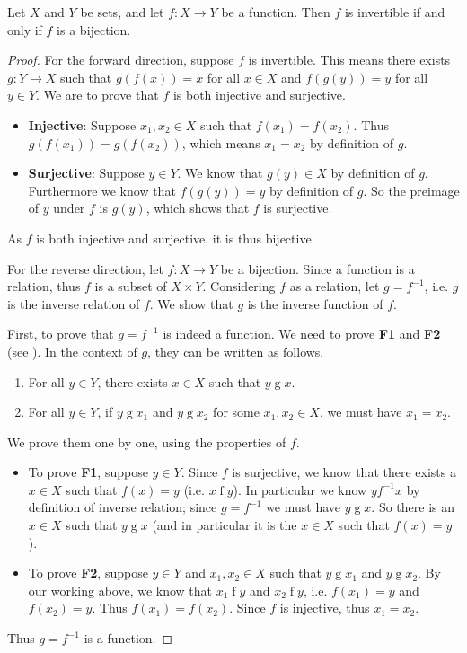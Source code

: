 \begin{theorem}\label{theorem:invertible-if-and-only-if-bijective}
    Let $X$ and $Y$ be sets, and let $f: X \to Y$ be a function. Then $f$ is invertible if and only if $f$ is a bijection.
\end{theorem}
\begin{proof}
    For the forward direction, suppose $f$ is invertible. This means there exists $g: Y \to X$ such that $g(f(x)) = x$ for all $x \in X$ and $f(g(y)) = y$ for all $y \in Y$. We are to prove that $f$ is both injective and surjective.
    \begin{itemize}
        \item \textbf{Injective}: Suppose $x_1, x_2 \in X$ such that $f(x_1) = f(x_2)$. Thus $g(f(x_1)) = g(f(x_2))$, which means $x_1 = x_2$ by definition of $g$.
        \item \textbf{Surjective}: Suppose $y \in Y$. We know that $g(y) \in X$ by definition of $g$. Furthermore we know that $f(g(y)) = y$ by definition of $g$. So the preimage of $y$ under $f$ is $g(y)$, which shows that $f$ is surjective.
    \end{itemize}
    As $f$ is both injective and surjective, it is thus bijective.

    For the reverse direction, let $f: X \to Y$ be a bijection. Since a function is a relation, thus $f$ is a subset of $X \times Y$. Considering $f$ as a relation, let $g = f^{-1}$, i.e. $g$ is the inverse relation of $f$. We show that $g$ is the inverse function of $f$.

    First, to prove that $g = f^{-1}$ is indeed a function. We need to prove \textbf{F1} and \textbf{F2} (see ). In the context of $g$, they can be written as follows.
    \begin{enumerate}[label=\textbf{F\arabic*.}]
        \item For all $y \in Y$, there exists $x \in X$ such that $y \mathrel{g} x$.
        \item For all $y \in Y$, if $y \mathrel{g} x_1$ and $y \mathrel{g} x_2$ for some $x_1, x_2 \in X$, we must have $x_1 = x_2$.
    \end{enumerate}
    We prove them one by one, using the properties of $f$.
    \begin{itemize}
        \item To prove \textbf{F1}, suppose $y \in Y$. Since $f$ is surjective, we know that there exists a $x \in X$ such that $f(x) = y$ (i.e. $x \mathrel{f} y$). In particular we know $y \mathrel{f^{-1}} x$ by definition of inverse relation; since $g = f^{-1}$ we must have $y \mathrel{g} x$. So there is an $x \in X$ such that $y \mathrel{g} x$ (and in particular it is the $x \in X$ such that $f(x) = y$).
        \item To prove \textbf{F2}, suppose $y \in Y$ and $x_1, x_2 \in X$ such that $y \mathrel{g} x_1$ and $y \mathrel{g} x_2$. By our working above, we know that $x_1 \mathrel{f} y$ and $x_2 \mathrel{f} y$, i.e. $f(x_1) = y$ and $f(x_2) = y$. Thus $f(x_1) = f(x_2)$. Since $f$ is injective, thus $x_1 = x_2$.
    \end{itemize}
    Thus $g = f^{-1}$ is a function.


\end{proof}
